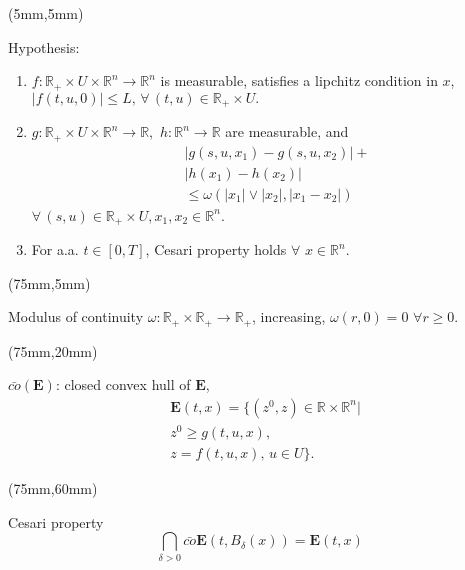 \begin{frame}[plain]
	\begin{textblock*}{60mm}(5mm,5mm)
		\begin{graybox}{Hypothesis:}
			\begin{enumerate}[(\textbf{{C}}-1)]
				\item<1->
					$
						f:\mathbb{R}_{+}\times U
						\times \mathbb{R}^n\rightarrow 
						\mathbb{R}^n
					$ is measurable, satisfies a lipchitz
					 condition in $x$,
					$
						|f(t,u,0)|\leq L,\,
						 \forall\,(t,u)\in
						 \mathbb{R}_{+}\times U .
					$
				\item<2->
					$
						g:\mathbb{R}_{+}\times U\times 
						\mathbb{R}^n\rightarrow \mathbb{R},
					$ 
					$
						h:\mathbb{R}^n\rightarrow \mathbb{R}
					$ are measurable, and
					\begin{align*}
						&|g(s,u,x_1)-g(s,u,x_2)|+\\
						&|h(x_1)-h(x_2)|\\
						&\leq \omega(|x_1|\vee |x_2|,|x_1-x_2|)
					\end{align*}
					$
						\forall\, (s,u)\in \mathbb{R}_{+}
						\times U,x_1,x_2\in \mathbb{R}^n
					$.
				\item<3->
					For a.a. $t\in[0,T]$, Cesari property holds $\forall$ $x\in \mathbb{R}^n$.
			\end{enumerate}	
		\end{graybox}
	\end{textblock*}
	{
		\begin{textblock*}{50mm}(75mm,5mm)
			\begin{yellowbox}{Modulus of continuity}
				$\omega:\mathbb{R}_{+}\times\mathbb{R}_{+}\rightarrow \mathbb{R}_{+}$, increasing, $\omega(r,0)=0$ 
				${\forall r\geq 0}$.
			\end{yellowbox}
		\end{textblock*}
	}
	{
		\begin{textblock*}{50mm}(75mm,20mm)
			\begin{yellowbox}{}
				$\bar{co}(\mathbf{E})$: closed convex hull of $\mathbf{E}$,
				\begin{align*}
					&\mathbf{E}(t,x)=\{(z^0,z)\in \mathbb{R}\times \mathbb{R}^n|\\
					&z^0\geq g(t,u,x),\\
					&z=f(t,u,x),\, u\in U\}.
				\end{align*}			
			\end{yellowbox}
		\end{textblock*}
	
		\begin{textblock*}{50mm}(75mm,60mm)
			\begin{yellowbox}{Cesari property}
				\begin{equation*}
				\bigcap_{\delta>0}\bar{co}\mathbf{E}(t,B_{\delta}(x))=\mathbf{E}(t,x)
				\end{equation*}			
			\end{yellowbox}
		\end{textblock*}
	}
\end{frame}

